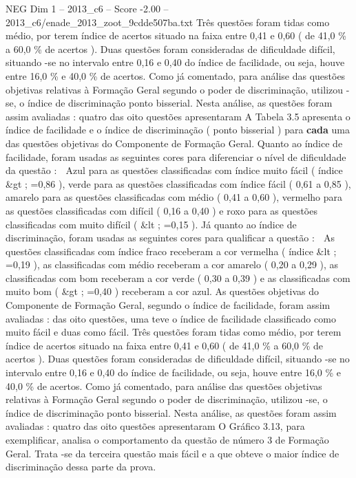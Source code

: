 \begin{textsample}{NEG Dim 1 – 2013\_c6 – Score -2.00 – 2013\_c6/enade\_2013\_zoot\_9cdde507ba.txt}
Três questões foram tidas como médio, por terem índice de acertos situado na faixa entre 0,41 e 0,60 ( de 41,0 \% a 60,0 \% de acertos ).
Duas questões foram consideradas de dificuldade difícil, situando -se no intervalo entre 0,16 e 0,40 do índice de facilidade, ou seja, houve entre 16,0 \% e 40,0 \% de acertos.
Como já comentado, para análise das questões objetivas relativas à Formação Geral segundo o poder de discriminação, utilizou -se, o índice de discriminação ponto bisserial.
Nesta análise, as questões foram assim avaliadas : quatro das oito questões apresentaram A Tabela 3.5 apresenta o índice de facilidade e o índice de discriminação ( ponto bisserial ) para \textbf{cada} uma das questões objetivas do Componente de Formação Geral.
Quanto ao índice de facilidade, foram usadas as seguintes cores para diferenciar o nível de dificuldade da questão :  Azul para as questões classificadas com índice muito fácil ( índice \&gt ; =0,86 ), verde para as questões classificadas com índice fácil ( 0,61 a 0,85 ), amarelo para as questões classificadas com médio ( 0,41 a 0,60 ), vermelho para as questões classificadas com difícil ( 0,16 a 0,40 ) e roxo para as questões classificadas com muito difícil ( \&lt ; =0,15 ).
Já quanto ao índice de discriminação, foram usadas as seguintes cores para qualificar a questão :  As questões classificadas com índice fraco receberam a cor vermelha ( índice \&lt ; =0,19 ), as classificadas com médio receberam a cor amarelo ( 0,20 a 0,29 ), as classificadas com bom receberam a cor verde ( 0,30 a 0,39 ) e as classificadas com muito bom ( \&gt ; =0,40 ) receberam a cor azul.
As questões objetivas do Componente de Formação Geral, segundo o índice de facilidade, foram assim avaliadas : das oito questões, uma teve o índice de facilidade classificado como muito fácil e duas como fácil.
Três questões foram tidas como médio, por terem índice de acertos situado na faixa entre 0,41 e 0,60 ( de 41,0 \% a 60,0 \% de acertos ).
Duas questões foram consideradas de dificuldade difícil, situando -se no intervalo entre 0,16 e 0,40 do índice de facilidade, ou seja, houve entre 16,0 \% e 40,0 \% de acertos.
Como já comentado, para análise das questões objetivas relativas à Formação Geral segundo o poder de discriminação, utilizou -se, o índice de discriminação ponto bisserial.
Nesta análise, as questões foram assim avaliadas : quatro das oito questões apresentaram O Gráfico 3.13, para exemplificar, analisa o comportamento da questão de número 3 de Formação Geral.
Trata -se da terceira questão mais fácil e a que obteve o maior índice de discriminação dessa parte da prova.

\end{textsample}
